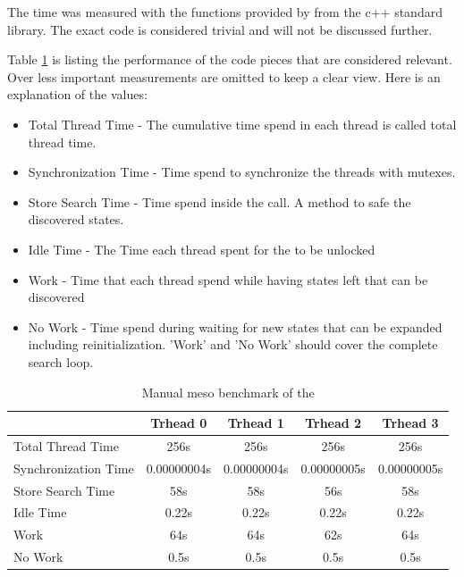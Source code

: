 The time was measured with the functions provided by  from the c++ standard library. The exact code is considered trivial and will not be discussed further.

Table \ref{ManualBenchmark} is listing the performance of the code pieces that are considered relevant. Over less important measurements are omitted to keep a clear view. Here is an explanation of the values:
\begin{itemize}
    \item Total Thread Time - The cumulative time spend in each thread is called total thread time.
    \item Synchronization Time - Time spend to synchronize the threads with mutexes.
    \item Store Search Time - Time spend inside the  call. A method to safe the discovered states.
    \item Idle Time - The Time each thread spent for the  to be unlocked
    \item Work - Time that each thread spend while having states left that can be discovered
    \item No Work - Time spend during waiting for new states that can be expanded including reinitialization. 'Work' and  'No Work' should cover the complete search loop.
\end{itemize}

\begin{center}
    \begin{table}[H]
        \centering
        \begin{tabular}{ | l | c | c | c | c |}
            \hline
            \textbf{} & \textbf{Trhead 0} & \textbf{Trhead 1} & \textbf{Trhead 2} & \textbf{Trhead 3}\\ \hline
            Total Thread Time & 256s & 256s & 256s & 256s \\ 
            Synchronization Time & 0.00000004s & 0.00000004s & 0.00000005s & 0.00000005s \\
            Store Search Time & 58s & 58s & 56s & 58s \\ 
            Idle Time & 0.22s & 0.22s & 0.22s & 0.22s \\ 
            Work & 64s & 64s & 62s & 64s \\ 
            No Work & 0.5s & 0.5s & 0.5s & 0.5s \\ \hline
        \end{tabular}
        \caption{Manual meso benchmark of the }
        \label{ManualBenchmark}
    \end{table}
\end{center}

